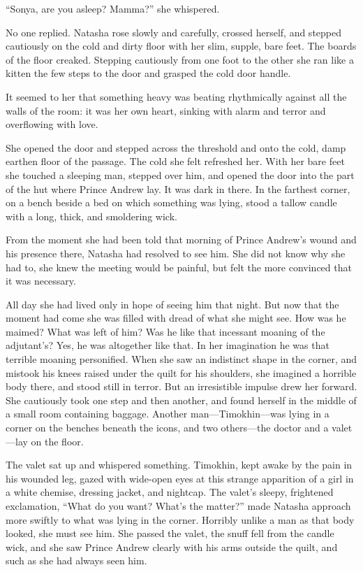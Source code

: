 ``Sonya, are you asleep? Mamma?'' she whispered.

No one replied. Natasha rose slowly and carefully, crossed
herself, and stepped cautiously on the cold and dirty floor with
her slim, supple, bare feet. The boards of the floor
creaked. Stepping cautiously from one foot to the other she ran
like a kitten the few steps to the door and grasped the cold door
handle.

It seemed to her that something heavy was beating rhythmically
against all the walls of the room: it was her own heart, sinking
with alarm and terror and overflowing with love.

She opened the door and stepped across the threshold and onto the
cold, damp earthen floor of the passage. The cold she felt
refreshed her. With her bare feet she touched a sleeping man,
stepped over him, and opened the door into the part of the hut
where Prince Andrew lay. It was dark in there. In the farthest
corner, on a bench beside a bed on which something was lying,
stood a tallow candle with a long, thick, and smoldering wick.

From the moment she had been told that morning of Prince Andrew's
wound and his presence there, Natasha had resolved to see
him. She did not know why she had to, she knew the meeting would
be painful, but felt the more convinced that it was necessary.

All day she had lived only in hope of seeing him that night. But
now that the moment had come she was filled with dread of what
she might see. How was he maimed? What was left of him? Was he
like that incessant moaning of the adjutant's? Yes, he was
altogether like that. In her imagination he was that terrible
moaning personified. When she saw an indistinct shape in the
corner, and mistook his knees raised under the quilt for his
shoulders, she imagined a horrible body there, and stood still in
terror. But an irresistible impulse drew her forward. She
cautiously took one step and then another, and found herself in
the middle of a small room containing baggage. Another
man---Timokhin---was lying in a corner on the benches beneath the
icons, and two others---the doctor and a valet---lay on the
floor.

The valet sat up and whispered something. Timokhin, kept awake by
the pain in his wounded leg, gazed with wide-open eyes at this
strange apparition of a girl in a white chemise, dressing jacket,
and nightcap.  The valet's sleepy, frightened exclamation, ``What
do you want? What's the matter?'' made Natasha approach more
swiftly to what was lying in the corner. Horribly unlike a man as
that body looked, she must see him. She passed the valet, the
snuff fell from the candle wick, and she saw Prince Andrew
clearly with his arms outside the quilt, and such as she had
always seen him.


